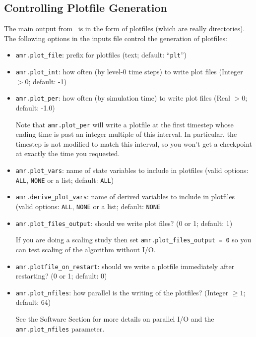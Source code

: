 \subsection{Controlling Plotfile Generation}
\label{sec:PlotFiles}
The main output from \iamr\ is in the form of plotfiles (which are
really directories).  The following options in the inputs file control
the generation of plotfiles:
\begin{itemize}
\item {\tt amr.plot\_file}: prefix for plotfiles (text; default:
  ``{\tt plt}'')

\item {\tt amr.plot\_int}: how often (by level-0 time steps) to write
  plot files (Integer $> 0$; default: -1)

\item {\tt amr.plot\_per}: how often (by simulation time) to write
  plot files (Real $> 0$; default: -1.0)

  Note that {\tt amr.plot\_per} will write a plotfile at the first
  timestep whose ending time is past an integer multiple of this interval.
  In particular, the timestep is not modified to match this interval, so
  you won't get a checkpoint at exactly the time you requested.

\item {\tt amr.plot\_vars}: name of state variables to include in
  plotfiles (valid options: {\tt ALL}, {\tt NONE} or a list; default:
  {\tt ALL})

\item {\tt amr.derive\_plot\_vars}: name of derived variables to
  include in plotfiles (valid options: {\tt ALL}, {\tt NONE} or a
  list; default: {\tt NONE}

\item {\tt amr.plot\_files\_output}: should we write plot files? (0 or
  1; default: 1)

If you are doing a scaling study then set {\tt amr.plot\_files\_output
  = 0} so you can test scaling of the algorithm without I/O.

\item {\tt amr.plotfile\_on\_restart}: should we write a plotfile
  immediately after restarting?  (0 or 1; default: 0)
  
\item {\tt amr.plot\_nfiles}: how parallel is the writing of the
  plotfiles?  (Integer $\geq 1$; default: 64)

See the Software Section for more details on parallel I/O and the {\tt
  amr.plot\_nfiles} parameter.

\end{itemize}

